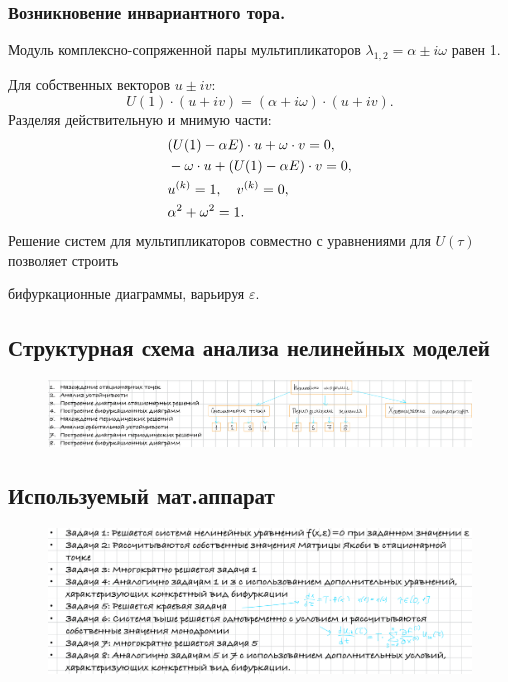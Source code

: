 	\subsubsection{Возникновение инвариантного тора.} 
	Модуль комплексно-сопряженной пары мультипликаторов \(\lambda_{1,2} = \alpha \pm i \omega\) равен 1. 
	\par
	Для собственных векторов \(u \pm i v\):
	\vspace{-0.5em}
	\begin{equation}
		U(1) \cdot (u + i v) = (\alpha + i \omega) \cdot (u + i v).
	\end{equation}
	\vspace{-0.5em}
	Разделяя действительную и мнимую части:
	\begin{equation}
		\begin{aligned}
			&(U(1) - \alpha E) \cdot u + \omega \cdot v = 0, \\
			&-\omega \cdot u + (U(1) - \alpha E) \cdot v = 0, \\
			&u^{(k)} = 1, \quad v^{(k)} = 0, \\
			&\alpha^2 + \omega^2 = 1.
		\end{aligned}
		\vspace{-0.5em}
	\end{equation}
	Решение систем для мультипликаторов совместно с уравнениями для \(U(\tau)\) позволяет строить 
	\par
	бифуркационные диаграммы, варьируя \(\varepsilon\).
	\vspace{-1.25em}
	\subsection{Структурная схема анализа нелинейных моделей}
	\vspace{-1.5em}
	\begin{figure}[H]
		\centering
		\includegraphics[width=1\linewidth, height=0.15\textheight]{img/15_01}
		\label{fig:15_01}
	\end{figure}
	\vspace{-2em}
	\subsection{Используемый мат.аппарат}
	\vspace{-1.5em}
	\begin{figure}[H]
		\centering
		\includegraphics[width=1\linewidth, height=0.15\textheight]{img/15_02}
		\label{fig:15_02}
	\end{figure}
	
